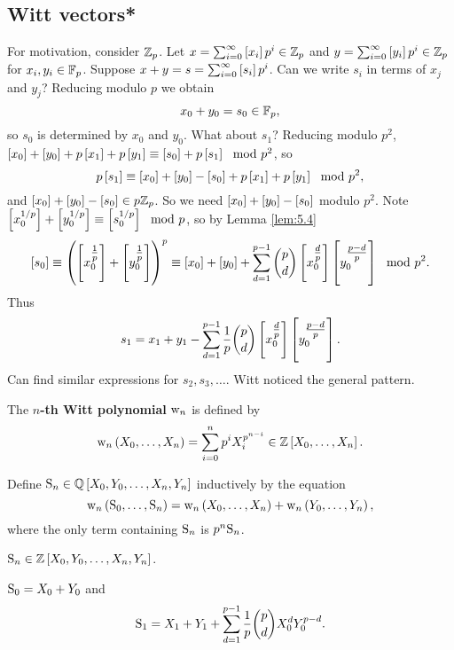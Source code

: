\subsection{Witt vectors*}

For motivation, consider $ \ZZ_p $. Let $ x = \sum_{i = 0}^\infty \sbr{x_i}p^i \in \ZZ_p $ and $ y = \sum_{i = 0}^\infty \sbr{y_i}p^i \in \ZZ_p $ for $ x_i, y_i \in \FF_p $. Suppose $ x + y = s = \sum_{i = 0}^\infty \sbr{s_i}p^i $. Can we write $ s_i $ in terms of $ x_j $ and $ y_j $? Reducing modulo $ p $ we obtain
$$ x_0 + y_0 = s_0 \in \FF_p, $$
so $ s_0 $ is determined by $ x_0 $ and $ y_0 $. What about $ s_1 $? Reducing modulo $ p^2 $, $ \sbr{x_0} + \sbr{y_0} + p\sbr{x_1} + p\sbr{y_1} \equiv \sbr{s_0} + p\sbr{s_1} \mod p^2 $, so
$$ p\sbr{s_1} \equiv \sbr{x_0} + \sbr{y_0} - \sbr{s_0} + p\sbr{x_1} + p\sbr{y_1} \mod p^2, $$
and $ \sbr{x_0} + \sbr{y_0} - \sbr{s_0} \in p\ZZ_p $. So we need $ \sbr{x_0} + \sbr{y_0} - \sbr{s_0} $ modulo $ p^2 $. Note $ \sbr{x_0^{1 / p}} + \sbr{y_0^{1 / p}} \equiv \sbr{s_0^{1 / p}} \mod p $, so by Lemma \ref{lem:5.4}
$$ \sbr{s_0} \equiv \br{\sbr{x_0^{\tfrac{1}{p}}} + \sbr{y_0^{\tfrac{1}{p}}}}^p \equiv \sbr{x_0} + \sbr{y_0} + \sum_{d = 1}^{p - 1} \binom{p}{d}\sbr{x_0^{\tfrac{d}{p}}}\sbr{y_0^{\tfrac{p - d}{p}}} \mod p^2. $$
Thus
$$ s_1 = x_1 + y_1 - \sum_{d = 1}^{p - 1} \dfrac{1}{p}\binom{p}{d}\sbr{x_0^{\tfrac{d}{p}}}\sbr{y_0^{\tfrac{p - d}{p}}}. $$
Can find similar expressions for $ s_2, s_3, \dots $. Witt noticed the general pattern.

\pagebreak

\begin{definition}
The \textbf{$ n $-th Witt polynomial} $ \w_n $ is defined by
$$ \w_n\br{X_0, \dots, X_n} = \sum_{i = 0}^n p^iX_i^{p^{n - i}} \in \ZZ\sbr{X_0, \dots, X_n}. $$
\end{definition}

Define $ \S_n \in \QQ\sbr{X_0, Y_0, \dots, X_n, Y_n} $ inductively by the equation
$$ \w_n\br{\S_0, \dots, \S_n} = \w_n\br{X_0, \dots, X_n} + \w_n\br{Y_0, \dots, Y_n}, $$
where the only term containing $ \S_n $ is $ p^n\S_n $.

\begin{fact*}[Witt]
$ \S_n \in \ZZ\sbr{X_0, Y_0, \dots, X_n, Y_n} $.
\end{fact*}

\begin{example*}
$ \S_0 = X_0 + Y_0 $ and
$$ \S_1 = X_1 + Y_1 + \sum_{d = 1}^{p - 1} \dfrac{1}{p}\binom{p}{d}X_0^dY_0^{p - d}. $$
\end{example*}

